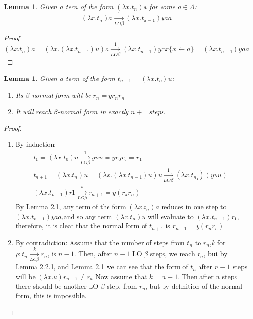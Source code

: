 \message{ !name(VU-CS-BSc-thesis-template.tex)}\documentclass[11pt]{article}
\newtheorem{lemma}[theorem]{Lemma}
\begin{document}
\begin{lemma}\label{lemma1}
  Given a tern of the form $(\lambda x .t_n)a$ for some $a \in \Lambda$:
  \begin{equation}
    (\lambda x .t_n)a \xrightarrow[LO \beta]{1} (\lambda x.t_{n-1})yaa
  \end{equation}
\end{lemma}
\begin{proof}
  \begin{equation}
    (\lambda x . t_n)a = (\lambda x .(\lambda x .t_{n-1})u)a \xrightarrow[LO \beta]{1} (\lambda x . t_{n-1})yxx \{ x \leftarrow a \} = (\lambda x .t_{n-1})yaa
  \end{equation}
\end{proof}
\begin{lemma}
  Given a term of the form $t_{n+1} = (\lambda x. t_n)u$:
  \begin{enumerate}
    \item Its $\beta$-normal form will be $r_n = yr_{n}r_{n}$
    \item It will reach $\beta$-normal form in exactly $n+1$ steps.
  \end{enumerate}
\end{lemma}
\begin{proof}
  \begin{enumerate}
    \item By induction:
          \begin{equation}
            \begin{split}
              & t_1 = (\lambda x .t_0)u \xrightarrow[LO\beta]{1} yuu = yr_0r_0 = r_1 \\
              & t_{n+1} = (\lambda x .t_n) u = (\lambda x. (\lambda x . t_{n-1})u)u \xrightarrow[LO\beta]{1} (\lambda x .t_{n_1})(yuu) = \\
              & (\lambda x. t_{n -1})r1 \xrightarrow[LO\beta]{*}r_{n+1} = y(r_{n}r_{n})
            \end{split}
          \end{equation}
          By Lemma 2.1, any term of the form $(\lambda x. t_n)a$ reduces in one step to $(\lambda  x .t_{n-1})yaa$,and so any term $(\lambda x.t_n)u$ will evaluate to $(\lambda x .t_{n-1})r_1$, therefore, it is clear that the normal form of $t_{n+1}$ is $r_{n+1} = y(r_n r_n)$
    \item By contradiction:
          Assume that the number of steps from $t_n$ to $r_n$,$k$ for $\rho  : t_n \xrightarrow[LO\beta]{k} r_n$, is $n-1$. Then, after $n-1$ LO $\beta$ steps, we reach $r_n$, but by Lemma 2.2.1, and Lemma 2.1 we can see that the form of $t_n$ after $n-1$ steps will be $(\lambda x . u)r_{n-1} \neq r_n$
          Now assume that $k = n+1$. Then after $n$ steps there should be another LO $\beta$ step, from $r_n$, but by definition of the normal form, this is impossible.

  \end{enumerate}
\end{proof}
\end{document}
